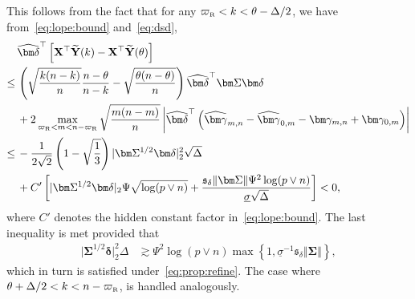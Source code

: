 \documentclass[11pt, a4paper]{article}
\newcommand{\mbf}{\mathbf}
\renewcommand{\l}{\left}
\renewcommand{\r}{\right}
\def\wh{\widehat}
\def\wt{\widetilde}
\newcommand{\cp}{\theta}
\newcommand{\nn}{\nonumber}
\newcommand{\Rf}{\text{\tiny \upshape R}} %
\theoremstyle{definition}
\theoremstyle{definition}
\theoremstyle{definition}
\theoremstyle{definition}
\theoremstyle{definition}
\theoremstyle{remark}
\theoremstyle{definition}
\theoremstyle{definition}
\theoremstyle{definition}
\begin{document}
This follows from the fact that for any $\varpi_{\Rf} < k < \cp - \Delta/2$, we have from~\eqref{eq:lope:bound} and~\eqref{eq:dsd},
\begin{align*}
& \, \wh{\bm\delta}^\top \l[ \mbf X^\top \wt{\mbf Y}(k) - \mbf X^\top \wt{\mbf Y}(\cp) \r]
\\
\le & \, \l( \sqrt{\frac{k (n - k)}{n}} \frac{n - \cp}{n - k} - \sqrt{\frac{\cp(n - \cp)}{n}} \r) \wh{\bm\delta}^\top \bm\Sigma \bm\delta 
\\
& \, + 2 \max_{\varpi_{\Rf} < m < n - \varpi_{\Rf}}\sqrt{\frac{m (n - m)}{n}} \l\vert \wh{\bm\delta}^\top \l( \wh{\bm\gamma}_{m, n} - \wh{\bm\gamma}_{0, m} - \bm\gamma_{m, n} + \bm\gamma_{0, m} \r) \r\vert
\\
\le & \, - \frac{1}{2\sqrt{2}} \l( 1 - \sqrt{\frac{1}{3}} \r) \vert \bm\Sigma^{1/2} \bm\delta \vert_2^2 \sqrt{\Delta} 
\\
& \, + C' \l[ \vert \bm\Sigma^{1/2} \bm\delta \vert_2 \Psi\sqrt{\log(p \vee n)} + \frac{\mathfrak{s}_\delta \Vert \bm\Sigma \Vert \Psi^2 \log(p \vee n)}{\underline{\sigma} \sqrt{\Delta}} \r]
< 0,
\end{align*}
where $C'$ denotes the hidden constant factor in~\eqref{eq:lope:bound}.
The last inequality is met provided that
\begin{align}
\vert \bm\Sigma^{1/2} \bm\delta \vert_2^2 \Delta &\gtrsim \Psi^2 \log(p \vee n) \max\l\{1, \underline{\sigma}^{-1} \mathfrak{s}_\delta \Vert \bm\Sigma \Vert \r\},
\nn %
\end{align}
which in turn is satisfied under~\eqref{eq:prop:refine}.
The case where $\cp + \Delta/2 < k < n - \varpi_{\Rf}$, is handled analogously.
\end{document}

